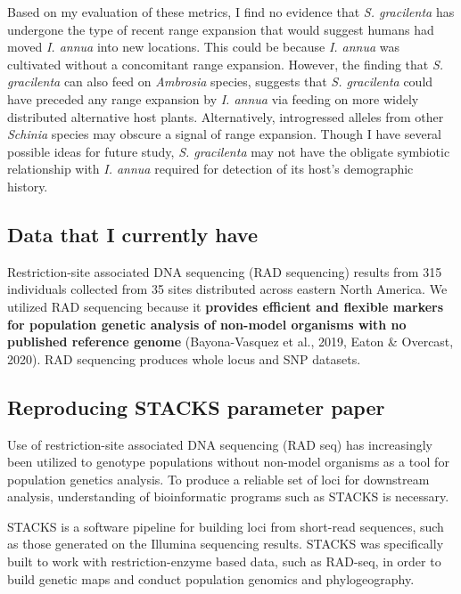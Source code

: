 Based on my evaluation of these metrics, I find no evidence that
\emph{S. gracilenta} has undergone the type of recent range expansion
that would suggest humans had moved \emph{I. annua} into new locations.
This could be because \emph{I. annua} was cultivated without a
concomitant range expansion. However, the finding that \emph{S.
gracilenta} can also feed on \emph{Ambrosia} species, suggests that
\emph{S. gracilenta} could have preceded any range expansion by \emph{I.
annua} via feeding on more widely distributed alternative host plants.
Alternatively, introgressed alleles from other \emph{Schinia} species
may obscure a signal of range expansion. Though I have several possible
ideas for future study, \emph{S. gracilenta} may not have the obligate
symbiotic relationship with \emph{I. annua} required for detection of
its host's demographic history.

\subsection{Data that I currently
have}\label{data-that-i-currently-have}

Restriction-site associated DNA sequencing (RAD sequencing) results from
315 individuals collected from 35 sites distributed across eastern North
America. We utilized RAD sequencing because it \textbf{provides
efficient and flexible markers for population genetic analysis of
non-model organisms with no published reference genome} (Bayona-Vasquez
et al., 2019, Eaton \& Overcast, 2020). RAD sequencing produces whole
locus and SNP datasets.

\subsection{Reproducing STACKS parameter
paper}\label{reproducing-stacks-parameter-paper}

Use of restriction-site associated DNA sequencing (RAD seq) has
increasingly been utilized to genotype populations without non-model
organisms as a tool for population genetics analysis. To produce a
reliable set of loci for downstream analysis, understanding of
bioinformatic programs such as STACKS is necessary.

STACKS is a software pipeline for building loci from short-read
sequences, such as those generated on the Illumina sequencing results.
STACKS was specifically built to work with restriction-enzyme based
data, such as RAD-seq, in order to build genetic maps and conduct
population genomics and phylogeography.

